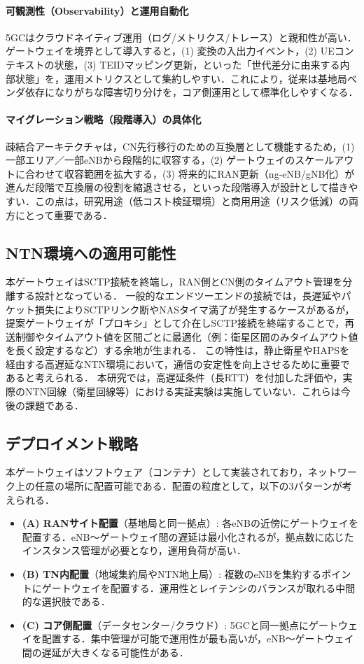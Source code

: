 \paragraph{可観測性（Observability）と運用自動化}
5GCはクラウドネイティブ運用（ログ/メトリクス/トレース）と親和性が高い．ゲートウェイを境界として導入すると，(1) 変換の入出力イベント，(2) UEコンテキストの状態，(3) TEIDマッピング更新，といった「世代差分に由来する内部状態」を，運用メトリクスとして集約しやすい．これにより，従来は基地局ベンダ依存になりがちな障害切り分けを，コア側運用として標準化しやすくなる．

\paragraph{マイグレーション戦略（段階導入）の具体化}
疎結合アーキテクチャは，CN先行移行のための互換層として機能するため，(1) 一部エリア／一部eNBから段階的に収容する，(2) ゲートウェイのスケールアウトに合わせて収容範囲を拡大する，(3) 将来的にRAN更新（ng-eNB/gNB化）が進んだ段階で互換層の役割を縮退させる，といった段階導入が設計として描きやすい．この点は，研究用途（低コスト検証環境）と商用用途（リスク低減）の両方にとって重要である．

\subsection{NTN環境への適用可能性}
本ゲートウェイはSCTP接続を終端し，RAN側とCN側のタイムアウト管理を分離する設計となっている．
一般的なエンドツーエンドの接続では，長遅延やパケット損失によりSCTPリンク断やNASタイマ満了が発生するケースがあるが，提案ゲートウェイが「プロキシ」として介在しSCTP接続を終端することで，再送制御やタイムアウト値を区間ごとに最適化（例：衛星区間のみタイムアウト値を長く設定するなど）する余地が生まれる．
この特性は，静止衛星やHAPSを経由する高遅延なNTN環境において，通信の安定性を向上させるために重要であると考えられる．
本研究では，高遅延条件（長RTT）を付加した評価や，実際のNTN回線（衛星回線等）における実証実験は実施していない．これらは今後の課題である．

\subsection{デプロイメント戦略}
本ゲートウェイはソフトウェア（コンテナ）として実装されており，ネットワーク上の任意の場所に配置可能である．配置の粒度として，以下の3パターンが考えられる．
\begin{itemize}
    \item \textbf{(A) RANサイト配置}（基地局と同一拠点）: 各eNBの近傍にゲートウェイを配置する．eNB〜ゲートウェイ間の遅延は最小化されるが，拠点数に応じたインスタンス管理が必要となり，運用負荷が高い．
    \item \textbf{(B) TN内配置}（地域集約局やNTN地上局）: 複数のeNBを集約するポイントにゲートウェイを配置する．運用性とレイテンシのバランスが取れる中間的な選択肢である．
    \item \textbf{(C) コア側配置}（データセンター/クラウド）: 5GCと同一拠点にゲートウェイを配置する．集中管理が可能で運用性が最も高いが，eNB〜ゲートウェイ間の遅延が大きくなる可能性がある．
\end{itemize}

